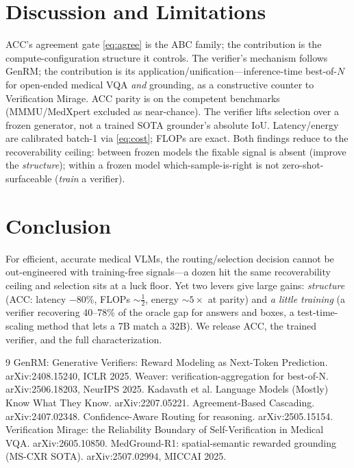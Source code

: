 \documentclass[conference]{IEEEtran}
\begin{document}
\section{Discussion and Limitations}
ACC's agreement gate \eqref{eq:agree} is the ABC family; the contribution is the compute-configuration structure it controls. The verifier's mechanism follows GenRM; the contribution is its application/unification---inference-time best-of-$N$ for open-ended medical VQA \emph{and} grounding, as a constructive counter to Verification Mirage. ACC parity is on the competent benchmarks (MMMU/MedXpert excluded as near-chance). The verifier lifts selection over a frozen generator, not a trained SOTA grounder's absolute IoU. Latency/energy are calibrated batch-1 via \eqref{eq:cost}; FLOPs are exact. Both findings reduce to the recoverability ceiling: between frozen models the fixable signal is absent (improve the \emph{structure}); within a frozen model which-sample-is-right is not zero-shot-surfaceable (\emph{train} a verifier).

\section{Conclusion}
For efficient, accurate medical VLMs, the routing/selection decision cannot be out-engineered with training-free signals---a dozen hit the same recoverability ceiling and selection sits at a luck floor. Yet two levers give large gains: \emph{structure} (ACC: latency $-80\%$, FLOPs ${\sim}\tfrac12$, energy ${\sim}5\times$ at parity) and \emph{a little training} (a verifier recovering 40--78\% of the oracle gap for answers and boxes, a test-time-scaling method that lets a 7B match a 32B). We release ACC, the trained verifier, and the full characterization.

\begin{thebibliography}{9}
\footnotesize
{} GenRM: Generative Verifiers: Reward Modeling as Next-Token Prediction. arXiv:2408.15240, ICLR 2025.
 Weaver: verification-aggregation for best-of-N. arXiv:2506.18203, NeurIPS 2025.
 Kadavath et al. Language Models (Mostly) Know What They Know. arXiv:2207.05221.
 Agreement-Based Cascading. arXiv:2407.02348.
 Confidence-Aware Routing for reasoning. arXiv:2505.15154.
 Verification Mirage: the Reliability Boundary of Self-Verification in Medical VQA. arXiv:2605.10850.
 MedGround-R1: spatial-semantic rewarded grounding (MS-CXR SOTA). arXiv:2507.02994, MICCAI 2025.
\end{thebibliography}
\end{document}
